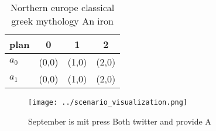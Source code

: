 \documentclass[a4paper]{article}
\begin{document}
\begin{table}
\begin{adjustbox}{width=0.5\columnwidth}
\begin{tabular}{|l|l|l|l|}
\hline
\textbf{plan} & \multicolumn{1}{c|}{\textbf{0}} & \multicolumn{1}{c|}{\textbf{1}} & \multicolumn{1}{c|}{\textbf{2}} \\ \hline
\textbf{$a_0$}  & (0,0) & (1,0) & (2,0) \\ \hline
\textbf{$a_1$}  & (0,0) & (1,0) & (2,0) \\ \hline
\end{tabular}
\end{adjustbox}
\caption{Northern europe classical greek mythology An iron
}
\end{table}

\begin{figure}
\centering
\texttt{[image: ../scenario\_visualization.png]}
\caption{September is mit press Both twitter and provide A
}
\end{figure}
 
\end{document}
